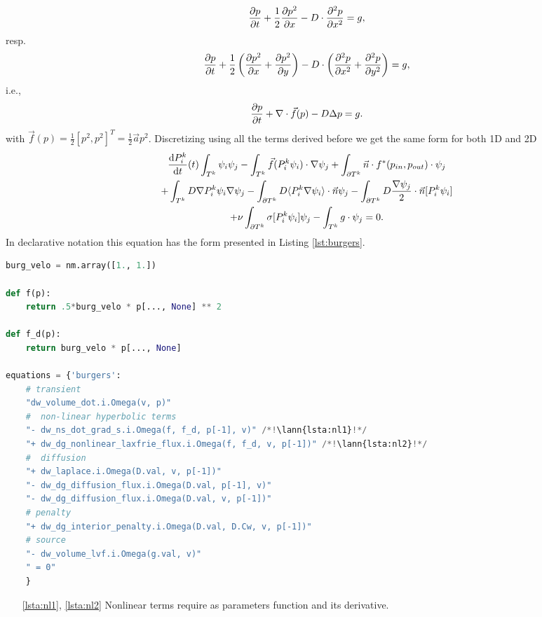 \begin{equation}
\frac{\partial p}{\partial t} + \frac{1}{2}\frac{\partial p^2}{\partial x} - D \cdot\frac{\partial^2 p}{\partial x^2} = g,
\end{equation}
resp.
\begin{equation}
\label{eq:ex_burgers}
    \frac{\partial p}{\partial t} + \frac{1}{2}\left(\frac{\partial p^2}{\partial x} + \frac{\partial p^2}{\partial y}\right)  - 
    D \cdot \left( \frac{\partial^2 p}{\partial x^2} + \frac{\partial^2 p}{\partial y^2} \right) 
    = g,
\end{equation}
i.e.,
\begin{equation}
    \frac{\partial p}{\partial t} + \nabla \cdot \vec{f}(p) - D\Delta p = g.
\end{equation}
with $\vec{f}(p) = \frac{1}{2}[p^2, p^2]^T = \frac{1}{2}\vec{a} p^2$.
Discretizing using all the terms derived before we get the same form for both 1D and 2D
\begin{multline}
    \frac{\text{d}P^k_i}{\text{d}t}(t)\int_{T^k}\psi_i\psi_j 
    - \int_{T^k} \vec{f}(P_i^k\psi_i)\cdot\nabla\psi_j 
    + \int_{\partial{T^k}} \vec{n} \cdot f^{*} (p_{in}, p_{out})\cdot\psi_j\\
    + \int_{T^k} D\nabla P^k_i\psi_i \nabla \psi_j
    - \int_{\partial T^k} D \langle P^k_i\nabla\psi_i\rangle \cdot \vec{n}\psi_j
    - \int_{\partial T^k} D \frac{\nabla \psi_j}{2}\cdot \vec{n} [P^k_i\psi_i] \\
    + \nu \int_{\partial T^k} \sigma [P^k_i\psi_i]\psi_j
    - \int_{T^k} g\cdot \psi_j
    = 0.
\end{multline}
In \sfepy{} declarative notation this equation has the form presented in 
Listing \ref{lst:burgers}.
\setcounter{lstannotation}{0}
\begin{lstlisting}[language=Python, caption=Viscous Burgers equation \label{lst:burgers}]
burg_velo = nm.array([1., 1.])

def f(p):
    return .5*burg_velo * p[..., None] ** 2

def f_d(p):
    return burg_velo * p[..., None]

equations = {'burgers':
    # transient
    "dw_volume_dot.i.Omega(v, p)"
    #  non-linear hyperbolic terms
    "- dw_ns_dot_grad_s.i.Omega(f, f_d, p[-1], v)" /*!\lann{lsta:nl1}!*/
    "+ dw_dg_nonlinear_laxfrie_flux.i.Omega(f, f_d, v, p[-1])" /*!\lann{lsta:nl2}!*/
    #  diffusion
    "+ dw_laplace.i.Omega(D.val, v, p[-1])"
    "- dw_dg_diffusion_flux.i.Omega(D.val, p[-1], v)"
    "- dw_dg_diffusion_flux.i.Omega(D.val, v, p[-1])"
    # penalty
    "+ dw_dg_interior_penalty.i.Omega(D.val, D.Cw, v, p[-1])"
    # source
    "- dw_volume_lvf.i.Omega(g.val, v)"
    " = 0"
    }
\end{lstlisting}
\begin{itemize}
    \item[\ref{lsta:nl1}, \ref{lsta:nl2}] Nonlinear terms require as parameters function 
    and its derivative.
\end{itemize}


